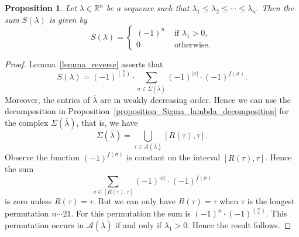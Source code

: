\documentclass[10pt]{amsart}
\newtheorem{prop}[theorem]{Proposition}
\theoremstyle{definition}
\newcommand{\Rrr}{\mathbb{R}}
\newcommand{\lambdaweaklyincreasing}
{\lambda_{1} \leq \lambda_{2} \leq \cdots \leq \lambda_{n}}
\begin{document}
\begin{prop}
Let $\lambda \in \Rrr^{n}$ be a sequence such that
$\lambdaweaklyincreasing$.
Then the sum $S(\lambda)$ is given by
$$
S(\lambda)
=
\begin{cases}
(-1)^{n} & \text{ if } \lambda_{1} > 0, \\
0 & \text{ otherwise.}
\end{cases}
$$ 
\label{proposition_S_lambda_increasing}
\end{prop}
\begin{proof}
Lemma~\ref{lemma_reverse}
asserts that
$$
S(\lambda)
=
(-1)^{\binom{n}{2}}
\cdot
\sum_{\sigma\in\Sigma(\overline{\lambda})}
(-1)^{|\sigma|} \cdot (-1)^{f(\sigma)}.
$$
Moreover,
the entries of 
$\overline{\lambda}$
are in weakly decreasing order.
Hence we can use
the decomposition
in Proposition~\ref{proposition_Sigma_lambda_decomposition}
for the complex 
$\Sigma(\overline{\lambda})$,
that is, we have
$$
\Sigma(\overline{\lambda})
=
\bigcup_{\tau \in \mathcal{A}(\overline{\lambda})} [R(\tau), \tau] .
$$
Observe the function
$(-1)^{f(\sigma)}$
is constant on the interval
$[R(\tau), \tau]$.
Hence the sum
$$ \sum_{\sigma \in [R(\tau), \tau]} (-1)^{|\sigma|} \cdot (-1)^{f(\sigma)} $$
is zero unless $R(\tau) = \tau$.
But we can only have $R(\tau)=\tau$
when $\tau$ is the longest permutation
$n \cdots 21$. For this permutation
the sum is $(-1)^{n} \cdot (-1)^{\binom{n}{2}}$.
This permutation occurs in $\mathcal{A}(\overline{\lambda})$
if and only if $\lambda_{1} > 0$.
Hence the result follows.
\end{proof}
\end{document}
